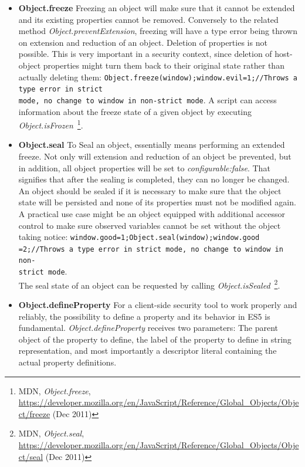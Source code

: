       \begin{itemize}
	\item \textbf{Object.freeze} Freezing an object will make sure that it cannot be extended and its existing properties cannot be removed. Conversely to the related method \textit{Object.preventExtension}, freezing will have a type error being thrown on extension and reduction of an object. Deletion of properties is not possible. This is very important in a security context, since deletion of host-object properties might turn them back to their original state rather than actually deleting them: \texttt{Object.freeze(window);window.evil=1;//Throws a type error in strict \\
mode, no change to window in non-strict mode}. A script can access information about the freeze state of a given object by executing \textit{Object.isFrozen}~\footnote{MDN, \textit{Object.freeze}, \url{https://developer.mozilla.org/en/JavaScript/Reference/Global_Objects/Object/freeze} (Dec 2011)}.
	\item \textbf{Object.seal} To Seal an object, essentially means performing an extended freeze. Not only will extension and reduction of an object be prevented, but in addition, all object properties will be set to \textit{configurable:false}. That signifies that after the sealing is completed, they can no longer be changed. An object should be sealed if it is necessary to make sure that the object state will be persisted and none of its properties must not be modified again. A practical use case might be an object equipped with additional accessor control to make sure observed variables cannot be set without the object taking notice: \texttt{window.good=1;Object.seal(window);window.good\\
=2;//Throws a type error in strict mode, no change to window in non-\\
strict mode}.\\
The seal state of an object can be requested by calling \textit{Object.isSealed}~\footnote{MDN, \textit{Object.seal}, \url{https://developer.mozilla.org/en/JavaScript/Reference/Global_Objects/Object/seal} (Dec 2011)}.
	\item \textbf{Object.defineProperty} For a client-side security tool to work properly and reliably, the possibility to define a property and its behavior in ES5 is fundamental. \textit{Object.defineProperty} receives two parameters: The parent object of the property to define, the label of the property to define in string representation, and most importantly a descriptor literal containing the actual property definitions. 

\end{itemize}
